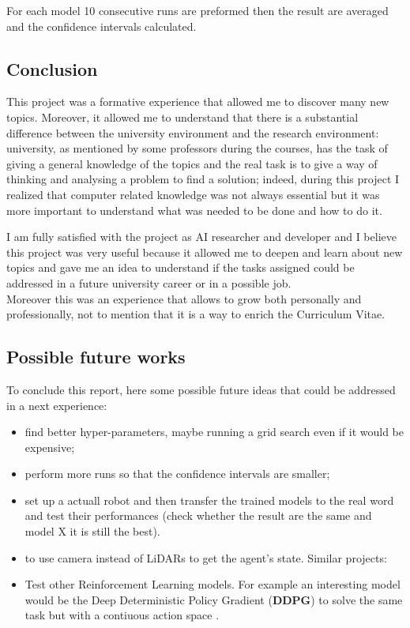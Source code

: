 \documentclass[14pt]{extarticle}
\def\sp{\vspace{5pt}}
\def\ppn{\vspace{10pt}}
\begin{document}
\begin{flushleft}
	For each model 10 consecutive runs are preformed then the result are averaged and the confidence intervals calculated.

\end{flushleft}

\newpage
\begin{center}
	\section{Conclusion}
	\sp
\end{center}
\begin{flushleft}

This project was a formative experience that allowed me to discover many new topics. Moreover, it allowed me to understand that there is a substantial difference between the university environment and the research environment: university, as mentioned by some professors during the courses, has the task of giving a general knowledge of the topics and the real task is to give a way of thinking and analysing a problem to find a solution; indeed, during this project I realized that computer related knowledge was not always essential but it was more important to understand what was needed to be done and how to do it.
\ppn

 I am fully satisfied with the project as AI researcher and developer and I believe this project was very useful because it allowed me to deepen and learn about new topics and gave me an idea to understand if the tasks assigned could be addressed in a future university career or in a possible job.
\\
Moreover this was an experience that allows to grow both personally and professionally, not to mention that it is a way to enrich the Curriculum Vitae.

\subsection{Possible future works}
To conclude this report, here some possible future ideas that could be addressed in a next experience:
\begin{itemize}
\item find better hyper-parameters, maybe running a grid search even if it would be expensive;
\item perform more runs so that the confidence intervals are smaller;
\item set up a actuall robot and then transfer the trained models to the real word and test their performances (check whether the result are the same and model X it is still the best).
\item to use camera instead of LiDARs to get the agent's state. Similar projects: \cite{Nworks1, Nworks2}
\item Test other Reinforcement Learning models. For example an interesting model would be the Deep Deterministic Policy Gradient (\textbf{DDPG}) to solve the same task but with a contiuous action space \cite{Nworks3}.
\end{itemize}

\end{flushleft}
\end{document}
